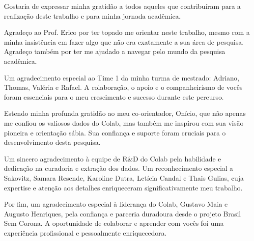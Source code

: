 Gostaria de expressar minha gratidão a todos aqueles que contribuíram para a realização deste trabalho e para minha jornada acadêmica.

Agradeço ao Prof. Erico por ter topado me orientar neste trabalho, mesmo com a minha insistência em fazer algo que não era exatamente a sua área de pesquisa. Agradeço também por ter me ajudado a navegar pelo mundo da pesquisa acadêmica.

Um agradecimento especial ao Time 1 da minha turma de mestrado: Adriano, Thomas, Valéria e Rafael. A colaboração, o apoio e o companheirismo de vocês foram essenciais para o meu crescimento e sucesso durante este percurso.

Estendo minha profunda gratidão ao meu co-orientador, Onício, que não apenas me confiou os valiosos dados do Colab, mas também me inspirou com sua visão pioneira e orientação sábia. Sua confiança e suporte foram cruciais para o desenvolvimento desta pesquisa.

Um sincero agradecimento à equipe de R\&D do Colab pela habilidade e dedicação na curadoria e extração dos dados. Um reconhecimento especial a Sakovitz, Samara Resende, Karoline Dutra, Letícia Candal e Thais Gulias, cuja expertise e atenção aos detalhes enriqueceram significativamente meu trabalho.

Por fim, um agradecimento especial à liderança do Colab, Gustavo Maia e Augusto Henriques, pela confiança e parceria duradoura desde o projeto Brasil Sem Corona. A oportunidade de colaborar e aprender com vocês foi uma experiência profissional e pessoalmente enriquecedora.